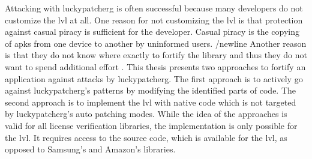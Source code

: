 Attacking with \gls{luckypatcherg} is often successful because many developers do not customize the \gls{lvl} at all.
One reason for not customizing the \gls{lvl} is that protection against casual piracy is sufficient for the developer.
Casual piracy is the copying of \gls{apk}s from one device to another by uninformed users.
/newline
Another reason is that they do not know where exactly to fortify the library and thus they do not want to spend additional effort \cite{developersSecuring}.
\newline
\newline
This thesis presents two approaches to fortify an application against attacks by \gls{luckypatcherg}.
\newline
The first approach is to actively go against \gls{luckypatcherg}'s patterns by modifying the identified parts of code.
\newline
The second approach is to implement the \gls{lvl} with native code which is not targeted by \gls{luckypatcherg}'s auto patching modes.
\newline
While the idea of the approaches is valid for all license verification libraries, the implementation is only possible for the \gls{lvl}.
It requires access to the source code, which is available for the \gls{lvl}, as opposed to Samsung's and Amazon's libraries.
